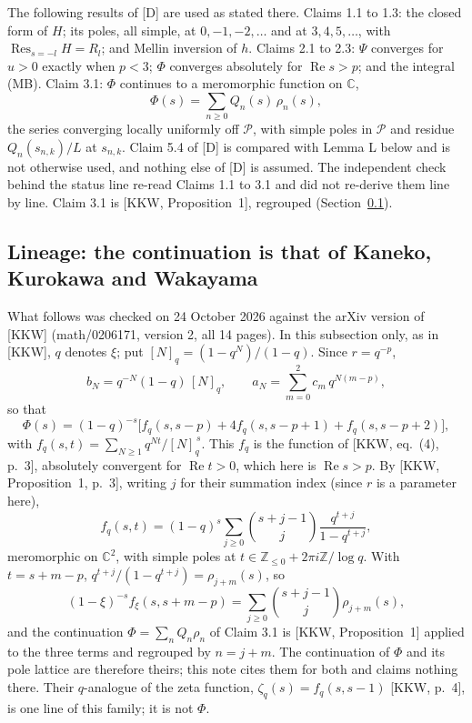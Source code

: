 \documentclass[11pt]{article}
\newcommand{\re}{\operatorname{Re}}
\newcommand{\Res}{\operatorname{Res}}
\begin{document}
The following results of [D] are used as stated there. Claims 1.1 to 1.3: the closed form of $H$; its poles, all simple, at $0,-1,-2,\dots$ and at $3,4,5,\dots$, with $\Res_{s=-l}H=R_l$; and Mellin inversion of $h$. Claims 2.1 to 2.3: $\Psi$ converges for $u>0$ exactly when $p<3$; $\Phi$ converges absolutely for $\re s>p$; and the integral (MB). Claim 3.1: $\Phi$ continues to a meromorphic function on $\mathbb{C}$,
\[
\Phi(s)=\sum_{n\ge0}Q_n(s)\,\rho_n(s),
\]
the series converging locally uniformly off $\mathcal{P}$, with simple poles in $\mathcal{P}$ and residue $Q_n(s_{n,k})/L$ at $s_{n,k}$. Claim 5.4 of [D] is compared with Lemma L below and is not otherwise used, and nothing else of [D] is assumed. The independent check behind the status line re-read Claims 1.1 to 3.1 and did not re-derive them line by line. Claim 3.1 is [KKW, Proposition~1], regrouped (Section~\ref{sec:lineage}).

\subsection{Lineage: the continuation is that of Kaneko, Kurokawa and Wakayama}\label{sec:lineage}

What follows was checked on 24 October 2026 against the arXiv version of [KKW] (math/0206171, version 2, all 14 pages). In this subsection only, as in [KKW], $q$ denotes $\xi$; put $[N]_q=(1-q^N)/(1-q)$. Since $r=q^{-p}$,
\[
b_N=q^{-N}(1-q)\,[N]_q,\qquad a_N=\sum_{m=0}^{2}c_m\,q^{N(m-p)},
\]
so that
\[
\Phi(s)=(1-q)^{-s}\bigl[f_q(s,s-p)+4f_q(s,s-p+1)+f_q(s,s-p+2)\bigr],
\]
with $f_q(s,t)=\sum_{N\ge1}q^{Nt}/[N]_q^{\,s}$. This $f_q$ is the function of [KKW, eq.~(4), p.~3], absolutely convergent for $\re t>0$, which here is $\re s>p$. By [KKW, Proposition~1, p.~3], writing $j$ for their summation index (since $r$ is a parameter here),
\[
f_q(s,t)=(1-q)^s\sum_{j\ge0}\binom{s+j-1}{j}\frac{q^{t+j}}{1-q^{t+j}},
\]
meromorphic on $\mathbb{C}^2$, with simple poles at $t\in\mathbb{Z}_{\le0}+2\pi i\mathbb{Z}/\log q$. With $t=s+m-p$, $q^{t+j}/(1-q^{t+j})=\rho_{j+m}(s)$, so
\[
(1-\xi)^{-s}f_\xi(s,s+m-p)=\sum_{j\ge0}\binom{s+j-1}{j}\rho_{j+m}(s),
\]
and the continuation $\Phi=\sum_nQ_n\rho_n$ of Claim 3.1 is [KKW, Proposition~1] applied to the three terms and regrouped by $n=j+m$. The continuation of $\Phi$ and its pole lattice are therefore theirs; this note cites them for both and claims nothing there. Their $q$-analogue of the zeta function, $\zeta_q(s)=f_q(s,s-1)$ [KKW, p.~4], is one line of this family; it is not $\Phi$.
\end{document}
